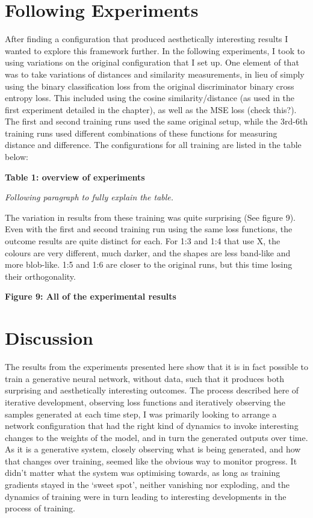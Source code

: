 \section{Following Experiments}

After finding a configuration that produced aesthetically interesting results I wanted to explore this framework further. 
In the following experiments, I took to using variations on the original configuration that I set up. 
One element of that was to take variations of distances and similarity measurements, in lieu of simply using the binary classification loss from the original discriminator binary cross entropy loss. 
This included using the cosine similarity/distance (as used in the first experiment detailed in the chapter), as well as the MSE loss (check this?). 
The first and second training runs used the same original setup, while the 3rd-6th training runs used different combinations of these functions for measuring distance and difference. 
The configurations for all training are listed in the table below:

\textbf{Table 1: overview of experiments}

\textit{Following paragraph to fully explain the table.}

The variation in results from these training was quite surprising (See figure 9). 
Even with the first and second training run using the same loss functions, the outcome results are quite distinct for each. 
For 1:3 and 1:4 that use X, the colours are very different, much darker, and the shapes are less band-like and more blob-like. 
1:5 and 1:6 are closer to the original runs, but this time losing their orthogonality. 

\textbf{Figure 9: All of the experimental results}


\section{Discussion}

The results from the experiments presented here show that it is in fact possible to train a generative neural network, without data, such that it produces both surprising and aesthetically interesting outcomes. 
The process described here of iterative development, observing loss functions and iteratively observing the samples generated at each time step, I was primarily looking to arrange a network configuration that had the right kind of dynamics to invoke interesting changes to the weights of the model, and in turn the generated outputs over time. 
As it is a generative system, closely observing what is being generated, and how that changes over training, seemed like the obvious way to monitor progress. 
It didn’t matter what the system was optimising towards, as long as training gradients stayed in the `sweet spot’, neither vanishing nor exploding, and the dynamics of training were in turn leading to interesting developments in the process of training. 

